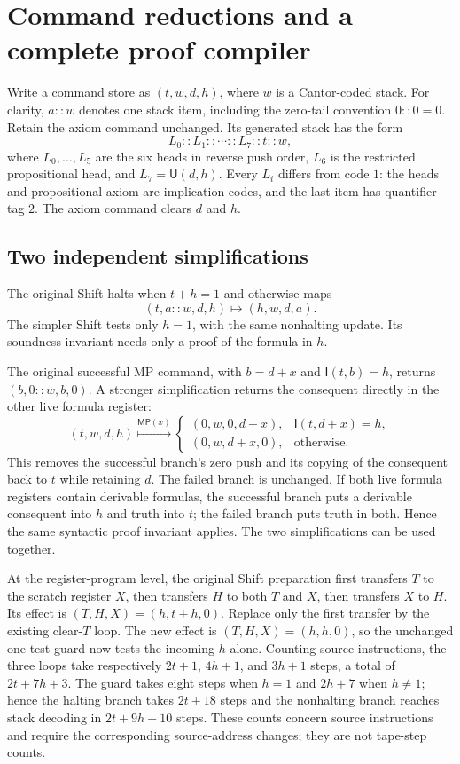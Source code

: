 \section{Command reductions and a complete proof compiler}
\label{sec:command-reductions}

Write a command store as $(t,w,d,h)$, where $w$ is a Cantor-coded stack.
For clarity, $a::w$ denotes one stack item, including the zero-tail
convention $0::0=0$. Retain the axiom command unchanged. Its generated
stack has the form
\[
 L_0::L_1::\cdots::L_7::t::w,
\]
where $L_0,\ldots,L_5$ are the six heads in reverse push order,
$L_6$ is the restricted propositional head, and
$L_7=\mathsf U(d,h)$. Every $L_i$ differs from code $1$: the heads
and propositional axiom are implication codes, and the last item has
quantifier tag $2$. The axiom command clears $d$ and $h$.

\subsection{Two independent simplifications}

The original Shift halts when $t+h=1$ and otherwise maps
\[
 (t,a::w,d,h)\longmapsto(h,w,d,a).
\]
The simpler Shift tests only $h=1$, with the same nonhalting update.
Its soundness invariant needs only a proof of the formula in $h$.

The original successful MP command, with $b=d+x$ and
$\mathsf I(t,b)=h$, returns $(b,0::w,b,0)$. A stronger simplification
returns the consequent directly in the other live formula register:
\begin{equation}\label{eq:new-mp-audit}
 (t,w,d,h)\overset{\mathsf{MP}(x)}\longmapsto
 \begin{cases}
 (0,w,0,d+x),&\mathsf I(t,d+x)=h,\\
 (0,w,d+x,0),&\text{otherwise}.
 \end{cases}
\end{equation}
This removes the successful branch's zero push and its copying of the
consequent back to $t$ while retaining $d$. The failed branch is unchanged.
If both live formula registers contain derivable formulas, the successful
branch puts a derivable consequent into $h$ and truth into $t$; the failed
branch puts truth in both. Hence the same syntactic proof invariant applies.
The two simplifications can be used together.

At the register-program level, the original Shift preparation first
transfers $T$ to the scratch register $X$, then transfers $H$ to both
$T$ and $X$, then transfers $X$ to $H$. Its effect is
$(T,H,X)=(h,t+h,0)$. Replace only the first transfer by the existing
clear-$T$ loop. The new effect is $(T,H,X)=(h,h,0)$, so the unchanged
one-test guard now tests the incoming $h$ alone. Counting source
instructions, the three loops take respectively $2t+1$, $4h+1$, and
$3h+1$ steps, a total of $2t+7h+3$. The guard takes eight steps when
$h=1$ and $2h+7$ when $h\ne1$; hence the halting branch takes
$2t+18$ steps and the nonhalting branch reaches stack decoding in
$2t+9h+10$ steps. These counts concern source instructions and require
the corresponding source-address changes; they are not tape-step counts.


